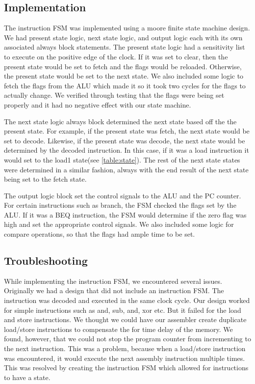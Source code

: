 \documentclass[11pt]{article}
\begin{document}
\subsection{Implementation}
The instruction FSM was implemented using a moore finite state machine design. We had present state logic, next state logic, and output logic each with its own associated always block statements. The present state logic had a sensitivity list to execute on the positive edge of the clock. If it was set to clear, then the present state would be set to fetch and the flags would be reloaded. Otherwise, the present state would be set to the next state. We also included some logic to fetch the flags from the ALU which made it so it took two cycles for the flags to actually change. We verified through testing that the flags were being set properly and it had no negative effect with our state machine. 

The next state logic always block determined the next state based off the the present state. For example, if the present state was fetch, the next state would be set to decode. Likewise, if the present state was decode, the next state would be determined by the decoded instruction. In this case, if it was a load instruction it would set to the load1 state(see \ref{table:state}). The rest of the next state states were determined in a similar fashion, always with the end result of the next state being set to the fetch state. 

The output logic block set the control signals to the ALU and the PC counter. For certain instructions such as branch, the FSM checked the flags set by the ALU. If it was a BEQ instruction, the FSM would determine if the zero flag was high and set the appropriate control signals. We also included some logic for compare operations, so that the flags had ample time to be set.
 
\subsection{Troubleshooting}
\label{fsm:trouble}
While implementing the instruction FSM, we encountered several issues. Originally we had a design that did not include an instruction FSM. The instruction was decoded and executed in the same clock cycle. Our design worked for simple instructions such as and, sub, and, xor etc. But it failed for the load and store instructions. We thought we could have our assembler create duplicate load/store instructions to compensate the for time delay of the memory. We found, however, that we could not stop the program counter from incrementing to the next instruction. This was a problem, because when a load/store instruction was encountered, it would execute the next assembly instruction multiple times. This was resolved by creating the instruction FSM which allowed for instructions to have a state.
\end{document}
